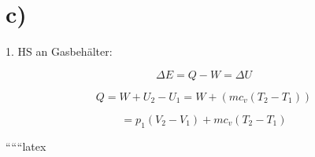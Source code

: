 

\section*{c)}

1. HS an Gasbehälter:

\[
\Delta E = Q - W = \Delta U
\]

\[
Q = W + U_2 - U_1 = W + (m c_v (T_2 - T_1))
\]

\[
= p_1 (V_2 - V_1) + m c_v (T_2 - T_1)
\]

``````latex